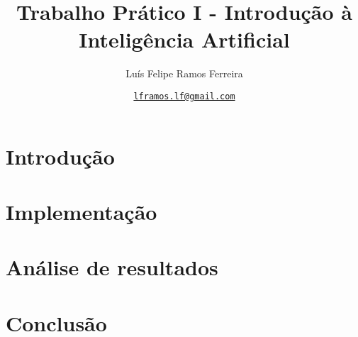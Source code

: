 \documentclass{article}
\title{Trabalho Prático I - Introdução à Inteligência Artificial}
\author{Luís Felipe Ramos Ferreira}
\date{\href{mailto:lframos.lf@gmail.com}{\texttt{lframos.lf@gmail.com}}
}
\begin{document}
\maketitle

\section{Introdução}

\section{Implementação}

\section{Análise de resultados}

\section{Conclusão}
\end{document}
